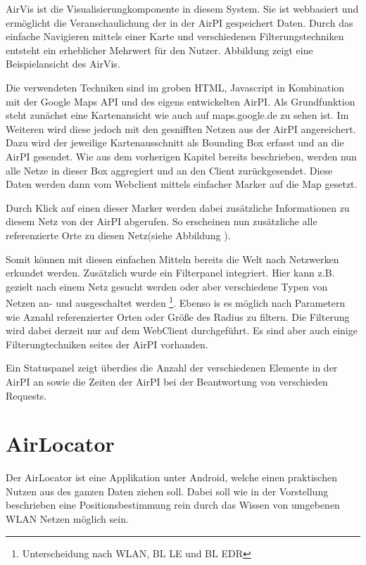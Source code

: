 \documentclass[11pt,a4paper]{article}
\begin{document}
AirVis ist die Visualisierungkomponente in diesem System. Sie ist webbasiert und ermöglicht die Veranschaulichung der in der AirPI gespeichert Daten. Durch das einfache Navigieren mittels einer Karte und verschiedenen Filterungstechniken entsteht ein erheblicher Mehrwert für den Nutzer. Abbildung
zeigt eine Beispielansicht des AirVis.

Die verwendeten Techniken sind im groben HTML, Javascript in Kombination mit der Google Maps API und des eigens entwickelten AirPI. Als Grundfunktion steht zunächst eine Kartenansicht wie auch auf maps.google.de zu sehen ist. Im Weiteren wird diese jedoch mit den gesnifften Netzen aus der AirPI angereichert. Dazu wird der jeweilige Kartenausschnitt als Bounding Box erfasst und an die AirPI gesendet. Wie aus dem vorherigen Kapitel bereits beschrieben, werden nun alle Netze in dieser Box aggregiert und an den Client zurückgesendet. Diese Daten werden dann vom Webclient mittels einfacher Marker auf die Map gesetzt.

Durch Klick auf einen dieser Marker werden dabei zusätzliche Informationen zu diesem Netz von der AirPI abgerufen. So erscheinen nun zusätzliche alle referenzierte Orte zu diesen Netz(siehe Abbildung
).

Somit können mit diesen einfachen Mitteln bereits die Welt nach Netzwerken erkundet werden. Zusätzlich wurde ein Filterpanel integriert. Hier kann z.B. gezielt nach einem Netz gesucht werden oder aber verschiedene Typen von Netzen an- und ausgeschaltet werden
\footnote{Unterscheidung nach WLAN, BL LE und BL EDR}.
Ebenso is es möglich nach Parametern wie Aznahl referenzierter Orten oder Größe des Radius zu filtern. Die Filterung wird dabei derzeit nur auf dem WebClient durchgeführt. Es sind aber auch einige Filterungtechniken seites der AirPI vorhanden.

Ein Statuspanel zeigt überdies die Anzahl der verschiedenen Elemente in der AirPI an sowie die Zeiten der AirPI bei der Beantwortung von verschieden Requests.

\section{AirLocator}

Der AirLocator ist eine Applikation unter Android, welche einen praktischen Nutzen aus des ganzen Daten ziehen soll. Dabei soll wie in der Vorstellung beschrieben eine Positionsbestimmung rein durch das Wissen von umgebenen WLAN Netzen möglich sein. 
\end{document}
